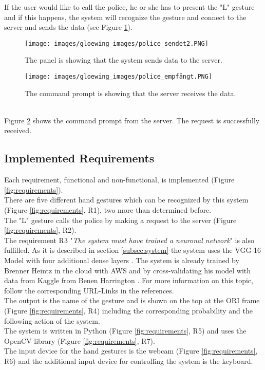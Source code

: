 If the user would like to call the police, he or she has to present the "L" gesture and if this happens, the system will recognize the gesture and connect to the server and sends the data (see Figure \ref{fig:police_sendet}).
\begin{figure}
\sidecaption
\texttt{[image: images/gloewing\_images/police\_sendet2.PNG]}
\caption{The panel is showing that the system sends data to the server.}
\label{fig:police_sendet}
\end{figure}
\begin{figure}
\sidecaption
\texttt{[image: images/gloewing\_images/police\_empfängt.PNG]}
\caption{The command prompt is showing that the server receives the data.}
\label{fig:police_empfängt}
\end{figure}\\
Figure \ref{fig:police_empfängt} shows the command prompt from the server. The request is successfully received.

\subsection{Implemented Requirements}
\label{subsec:implemented_requirements}
Each requirement, functional and non-functional, is implemented (Figure \ref{fig:requirements}).\\
There are five different hand gestures which can be recognized by this system (Figure \ref{fig:requirements}, R1), two more than determined before.\\
The "L" gesture calls the police by making a request to the server (Figure \ref{fig:requirements}, R2).\\
The requirement R3 "\textit{The system must have trained a neuronal network}" is also fulfilled. As it is described in section \ref{subsec:system} the system uses the VGG-16 Model with four additional dense layers \cite{Brenner2018}. The system is already trained by Brenner Heintz \cite{Brenner2018} in the cloud with AWS and by cross-validating his model with data from Kaggle from Benen Harrington \cite{Harrington2018}. For more information on this topic, follow the corresponding URL-Links in the references.\\
The output is the name of the gesture and is shown on the top at the ORI frame (Figure \ref{fig:requirements}, R4) including the corresponding probability and the following action of the system.\\
The system is written in Python (Figure \ref{fig:requirements}, R5) and uses the OpenCV library (Figure \ref{fig:requirements}, R7).\\
The input device for the hand gestures is the webcam (Figure \ref{fig:requirements}, R6) and the additional input device for controlling the system is the keyboard.


